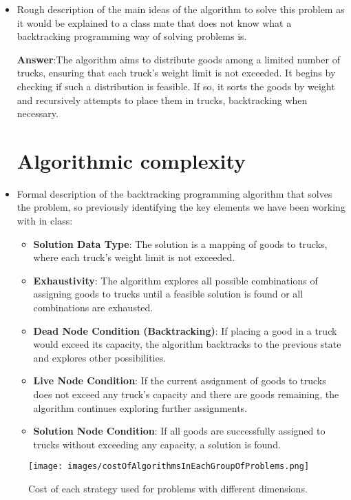 \documentclass{article}
\begin{document}
\begin{itemize}
	\item Rough description of the main ideas of the algorithm to solve this problem as it would
	      be explained to a class mate that does not know what a backtracking programming way of solving problems is.

	      \textbf{Answer}:\quad The algorithm aims to distribute goods among a limited number of trucks, ensuring
	      that each truck's weight limit is not exceeded. It begins by checking if such a distribution is feasible.
	      If so, it sorts the goods by weight and recursively attempts to place them in trucks, backtracking when necessary.
       
\section{Algorithmic complexity}
	\item Formal description of the backtracking programming algorithm that solves the problem, so previously
	      identifying the key elements we have been working with in class:
	      \begin{itemize}
		      \item \textbf{Solution Data Type}: The solution is a mapping of goods to trucks, where each truck's weight limit
		            is not exceeded.
		      \item \textbf{Exhaustivity}: The algorithm explores all possible combinations of assigning goods to trucks until
		            a feasible solution is found or all combinations are exhausted.
		      \item \textbf{Dead Node Condition (Backtracking)}: If placing a good in a truck would exceed its capacity, the
		            algorithm backtracks to the previous state and explores other possibilities.
		      \item \textbf{Live Node Condition}: If the current assignment of goods to trucks does not exceed any truck's
		            capacity and there are goods remaining, the algorithm continues exploring further assignments.
		      \item \textbf{Solution Node Condition}: If all goods are successfully assigned to trucks without exceeding
		            any capacity, a solution is found.
	      \end{itemize}
\end{itemize}
 \begin{center}
		      \begin{figure}[!ht]
			      \centering
			      \texttt{[image: images/costOfAlgorithmsInEachGroupOfProblems.png]}
			      \caption{Cost of each strategy used for problems with different dimensions.}
			      \label{fig:complexity-graph-comparison}
		      \end{figure}
	      \end{center}
\end{document}
